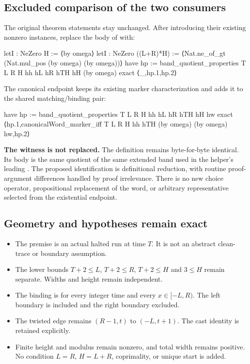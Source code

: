 \subsection{Excluded comparison of the two consumers}

The original theorem statements stay unchanged. After introducing their existing nonzero instances, replace the body of  with:
\begin{Lean}
  letI : NeZero H := ⟨by omega⟩
  letI : NeZero ((L+R)*H) := ⟨Nat.ne_of_gt (Nat.mul_pos (by omega) (by omega))⟩
  have hp := band_quotient_properties T L R H hh hL hR hTH hH (by omega)
  exact ⟨_,hp.1,hp.2⟩
\end{Lean}

The canonical endpoint keeps its existing marker characterization and adds it to the shared matching/binding pair:
\begin{Lean}
  have hp := band_quotient_properties T L R H hh hL hR hTH hH hw
  exact ⟨hp.1,canonicalWord_marker_iff T L R H hh hTH (by omega) (by omega) hw,hp.2⟩
\end{Lean}

\textbf{The witness is not replaced.} The  definition remains byte-for-byte identical. Its body is the same quotient of the same extended band used in the helper's leading . The proposed identification is definitional reduction, with routine proof-argument differences handled by proof irrelevance. There is no new choice operator, propositional replacement of the word, or arbitrary representative selected from the existential endpoint.

\subsection{Geometry and hypotheses remain exact}
\begin{itemize}
\item The premise is an actual halted run at time $T$. It is not an abstract clean-trace or boundary assumption.
\item The lower bounds $T+2\le L$, $T+2\le R$, $T+2\le H$ and $3\le H$ remain separate. Widths and height remain independent.
\item The binding is for every integer time and every $x\in[-L,R)$. The left boundary is included and the right boundary excluded.
\item The twisted edge remains $(R-1,t)$ to $(-L,t+1)$. The cast identity  is retained explicitly.
\item Finite height and modulus remain nonzero, and total width remains positive. No condition $L=R$, $H=L+R$, coprimality, or unique start is added.
\end{itemize}

